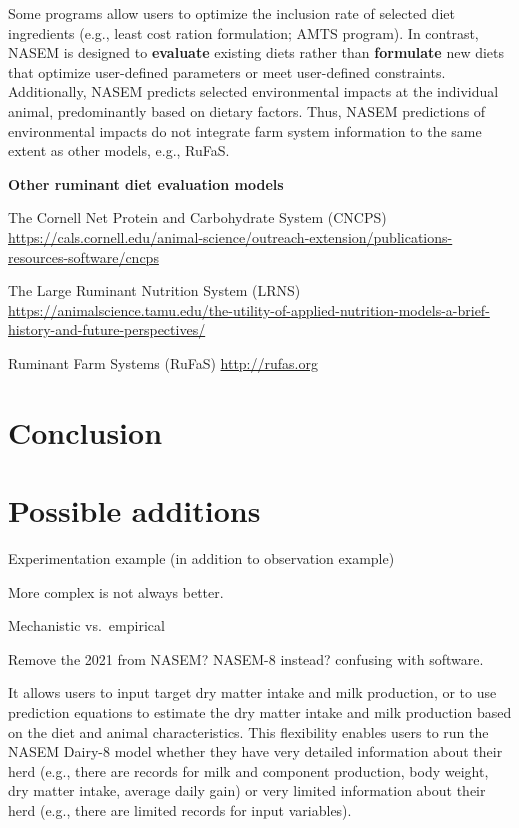 \documentclass[
]{book}
\begin{document}
Some programs allow users to optimize the inclusion rate of selected diet ingredients (e.g., least cost ration formulation; AMTS program). In contrast, NASEM \citeyearpar{NASEM8} is designed to \textbf{evaluate} existing diets rather than \textbf{formulate} new diets that optimize user-defined parameters or meet user-defined constraints. Additionally, NASEM \citeyearpar{NASEM8} predicts selected environmental impacts at the individual animal, predominantly based on dietary factors. Thus, NASEM \citeyearpar{NASEM8} predictions of environmental impacts do not integrate farm system information to the same extent as other models, e.g., RuFaS.

\textbf{Other ruminant diet evaluation models}

The Cornell Net Protein and Carbohydrate System (CNCPS) \url{https://cals.cornell.edu/animal-science/outreach-extension/publications-resources-software/cncps}

The Large Ruminant Nutrition System (LRNS) \url{https://animalscience.tamu.edu/the-utility-of-applied-nutrition-models-a-brief-history-and-future-perspectives/}

Ruminant Farm Systems (RuFaS) \url{http://rufas.org}

\hypertarget{conclusion}{%
\section{Conclusion}\label{conclusion}}

\hypertarget{possible-additions}{%
\section{Possible additions}\label{possible-additions}}

Experimentation example (in addition to observation example)

More complex is not always better.

Mechanistic vs.~empirical

Remove the 2021 from NASEM? NASEM-8 instead? confusing with software.

It allows users to input target dry matter intake and milk production, or to use prediction equations to estimate the dry matter intake and milk production based on the diet and animal characteristics. This flexibility enables users to run the NASEM Dairy-8 \citeyearpar{NASEM8} model whether they have very detailed information about their herd (e.g., there are records for milk and component production, body weight, dry matter intake, average daily gain) or very limited information about their herd (e.g., there are limited records for input variables).
\end{document}
